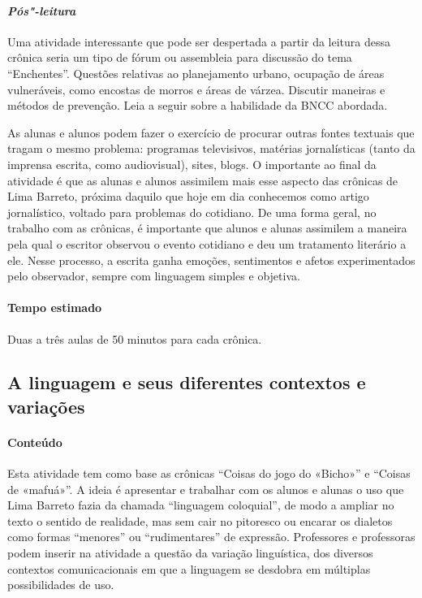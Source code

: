 \documentclass[11pt]{extarticle}
\begin{document}
\paragraph{\textit{Pós"-leitura}}

Uma atividade interessante que pode ser despertada a partir da leitura
dessa crônica seria um tipo de fórum ou assembleia para discussão do
tema ``Enchentes''. Questões relativas ao planejamento urbano,
ocupação de áreas vulneráveis, como encostas de morros e áreas de
várzea. Discutir maneiras e métodos de prevenção.
Leia a seguir sobre a habilidade da BNCC abordada.


As alunas e alunos podem fazer o exercício de procurar outras fontes
textuais que tragam o mesmo problema: programas televisivos, matérias
jornalísticas (tanto da imprensa escrita, como audiovisual), sites,
blogs. O importante ao final da atividade é que as alunas e alunos
assimilem mais esse aspecto das crônicas de Lima Barreto, próxima
daquilo que hoje em dia conhecemos como artigo jornalístico, voltado
para problemas do cotidiano. De uma forma geral, no trabalho com as
crônicas, é importante que alunos e alunas assimilem a maneira pela qual
o escritor observou o evento cotidiano e deu um tratamento literário a
ele. Nesse processo, a escrita ganha emoções, sentimentos e afetos
experimentados pelo observador, sempre com linguagem simples e objetiva.

\paragraph{Tempo estimado} Duas a três aulas de 50 minutos para cada
crônica.


\subsection{A linguagem e seus diferentes contextos e variações}



\paragraph{Conteúdo} Esta atividade tem como base as crônicas
``Coisas do jogo do «Bicho»'' e ``Coisas de
«mafuá»''. A ideia é apresentar e trabalhar com os alunos e alunas o
uso que Lima Barreto fazia da chamada ``linguagem coloquial'', de modo a
ampliar no texto o sentido de realidade, mas sem cair no pitoresco ou
encarar os dialetos como formas ``menores'' ou ``rudimentares'' de
expressão. Professores e professoras podem inserir na atividade a
questão da variação linguística, dos diversos contextos comunicacionais
em que a linguagem se desdobra em múltiplas possibilidades de uso.
\end{document}
